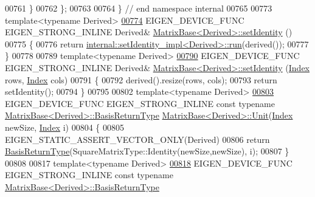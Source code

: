 \begin{DoxyCode}
00761   \}
00762 \};
00763 
00764 \} \textcolor{comment}{// end namespace internal}
00765 
00773 \textcolor{keyword}{template}<\textcolor{keyword}{typename} Derived>
\hyperlink{group___core___module_ae05be7fcc1ade707f0b73eb5f9d8cf33}{00774} EIGEN\_DEVICE\_FUNC EIGEN\_STRONG\_INLINE Derived& \hyperlink{group___core___module_ae05be7fcc1ade707f0b73eb5f9d8cf33}{MatrixBase<Derived>::setIdentity}
      ()
00775 \{
00776   \textcolor{keywordflow}{return} \hyperlink{struct_eigen_1_1internal_1_1set_identity__impl}{internal::setIdentity\_impl<Derived>::run}(derived());
00777 \}
00778 
00789 \textcolor{keyword}{template}<\textcolor{keyword}{typename} Derived>
\hyperlink{group___core___module_a054e0ad7e745cb1b9f2e87807e4d2200}{00790} EIGEN\_DEVICE\_FUNC EIGEN\_STRONG\_INLINE Derived& \hyperlink{group___core___module_ae05be7fcc1ade707f0b73eb5f9d8cf33}{MatrixBase<Derived>::setIdentity}
      (\hyperlink{namespace_eigen_a62e77e0933482dafde8fe197d9a2cfde}{Index} rows, \hyperlink{namespace_eigen_a62e77e0933482dafde8fe197d9a2cfde}{Index} cols)
00791 \{
00792   derived().resize(rows, cols);
00793   \textcolor{keywordflow}{return} setIdentity();
00794 \}
00795 
00802 \textcolor{keyword}{template}<\textcolor{keyword}{typename} Derived>
\hyperlink{group___core___module_a1f39dde25807c1f008aa874e690b3fed}{00803} EIGEN\_DEVICE\_FUNC EIGEN\_STRONG\_INLINE \textcolor{keyword}{const} \textcolor{keyword}{typename} 
      \hyperlink{group___core___module_class_eigen_1_1_block}{MatrixBase<Derived>::BasisReturnType} 
      \hyperlink{group___core___module_a1f39dde25807c1f008aa874e690b3fed}{MatrixBase<Derived>::Unit}(\hyperlink{namespace_eigen_a62e77e0933482dafde8fe197d9a2cfde}{Index} newSize, \hyperlink{namespace_eigen_a62e77e0933482dafde8fe197d9a2cfde}{Index} i)
00804 \{
00805   EIGEN\_STATIC\_ASSERT\_VECTOR\_ONLY(Derived)
00806   \textcolor{keywordflow}{return} \hyperlink{group___core___module_class_eigen_1_1_block}{BasisReturnType}(SquareMatrixType::Identity(newSize,newSize), i);
00807 \}
00808 
00817 \textcolor{keyword}{template}<\textcolor{keyword}{typename} Derived>
\hyperlink{group___core___module_a9d7e97faf7755d3e85e831153f02846c}{00818} EIGEN\_DEVICE\_FUNC EIGEN\_STRONG\_INLINE \textcolor{keyword}{const} \textcolor{keyword}{typename} 
      \hyperlink{group___core___module_class_eigen_1_1_block}{MatrixBase<Derived>::BasisReturnType} 

\end{DoxyCode}
